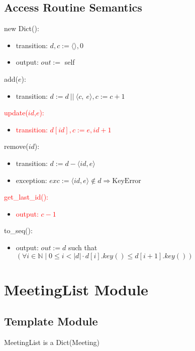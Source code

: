 \documentclass[12pt, titlepage]{article}
\begin{document}
\subsection*{Access Routine Semantics}
\noindent new Dict():
\begin{itemize}
    \item transition: $d, c := \langle \rangle, 0$
    
    \item output: $out :=$ self
\end{itemize}

\noindent add($e$):
\begin{itemize}
    \item transition: $d :=  d\ ||\ \langle c,\ e \rangle, c := c + 1$
\end{itemize}

\noindent\textcolor{red}{update($id$,$e$):}
\begin{itemize}
    \item \textcolor{red}{transition: $d[id],c := e,id+1$}
\end{itemize}

\noindent remove($id$):
\begin{itemize}
    \item transition: $d :=  d - \langle id, e \rangle$
    \item exception: $exc := \langle id, e \rangle \notin d \Rightarrow \text{KeyError}$
\end{itemize}

\noindent\textcolor{red}{get\_last\_id():}
\begin{itemize}
    \item \textcolor{red}{output: $c - 1$}
\end{itemize}

\noindent to\_seq():
\begin{itemize}
    \item output: $out := d$ such that $(\forall i \in \mathbb{N} \mid 0 \leq i < |d| \cdot d[i].key() \leq d[i + 1].key())$
\end{itemize}

\newpage
\section* {MeetingList Module}

\subsection*{Template Module}
MeetingList is a Dict(Meeting)
\end{document}
